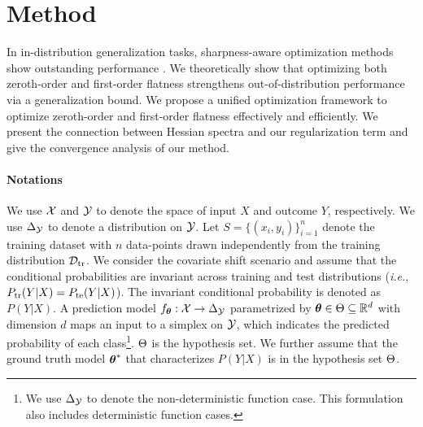 \section{Method}
In in-distribution generalization tasks, sharpness-aware optimization methods show outstanding performance \cite{foret2021sharpness}. We theoretically show that optimizing both zeroth-order and first-order flatness strengthens out-of-distribution performance via a generalization bound. We propose a unified optimization framework to optimize zeroth-order and first-order flatness effectively and efficiently. We present the connection between Hessian spectra and our regularization term and give the convergence analysis of our method.

\paragraph{Notations} We use $\mathcal{X}$ and $\mathcal{Y}$ to denote the space of input $X$ and outcome $Y$, respectively. We use $\Delta_{\mathcal{Y}}$ to denote a distribution on $\mathcal{Y}$.
Let $S = \{(x_i, y_i)\}_{i=1}^n$ denote the training dataset with $n$ data-points drawn independently from the training distribution $\mathcal{D}_{{\text{tr}}}$. We consider the covariate shift scenario \cite{ben2006analysis,shimodaira2000improving,xu2022theoretical} and assume that the conditional probabilities are invariant across training and test distributions (\textit{i.e.}, $P_{{\text{tr}}}(Y|X) = P_{{\text{te}}}(Y|X)$). The invariant conditional probability is denoted as $P(Y|X)$.
A prediction model $f_{\boldsymbol{\theta}}: \mathcal{X} \rightarrow \Delta_{\mathcal{Y}}$ parametrized by $\boldsymbol{\theta} \in \Theta \subseteq \mathbb{R}^d$ with dimension $d$ maps an input to a simplex on $\mathcal{Y}$, which indicates the predicted probability of each class\footnote{We use $\Delta_{\mathcal{Y}}$ to denote the non-deterministic function case. This formulation also includes deterministic function cases.}. $\Theta$ is the hypothesis set. We further assume that the ground truth model $\boldsymbol{\theta}^*$ that characterizes $P(Y|X)$ is in the hypothesis set $\Theta$.


